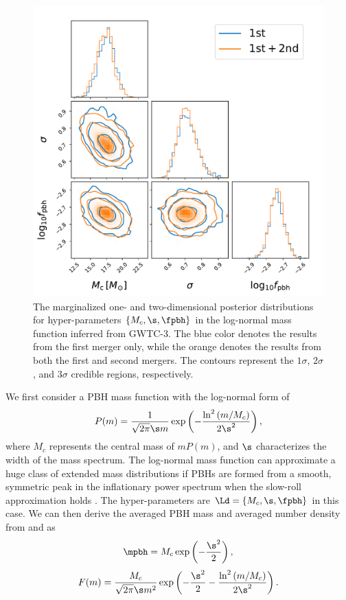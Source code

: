 \documentclass[
reprint,           %
superscriptaddress,%
amsmath,           %
amssymb,           %
aps,               %
prd,               %
notitlepage,       %
longbibliography,  %
floatfix,          %
nofootinbib,
]{revtex4-1}
\def\({\left(}
\def\){\right)}
\def\e{\begin{equation}}
\def\q{\end{equation}}
\begin{document}
\begin{figure}[tbp!]
	\centering
	\includegraphics[width=\linewidth]{post-log.pdf}
	\caption{\label{posterior-log}The marginalized one- and two-dimensional posterior distributions for hyper-parameters $\{M_c, \s, \fpbh\}$ in the log-normal mass function inferred from GWTC-3. The blue color denotes the results from the first merger only, while the orange denotes the results from both the first and second mergers. The contours represent the $1\sigma$, $2\sigma$, and $3\sigma$ credible regions, respectively.}
\end{figure}

We first consider a PBH mass function with the log-normal form of \cite{Dolgov:1992pu}
\e\label{log}
P(m) = \frac{1}{\sqrt{2\pi} \s m} \exp \(-\frac{\ln^2\(m/M_c\)}{2\s^2}\),
\q
where $M_c$ represents the central mass of $m P(m)$, and $\s$ characterizes the width of the mass spectrum.
The log-normal mass function can approximate a huge class of extended mass distributions if PBHs are formed from a smooth, symmetric peak in the inflationary power spectrum when the slow-roll approximation holds \cite{Green:2016xgy,Carr:2017jsz,Kannike:2017bxn}.
The hyper-parameters are $\Ld = \{M_c, \s, \fpbh\}$ in this case. 
We can then derive the averaged PBH mass and averaged number density from  and  as
\e
\mpbh = M_c \exp \(-\frac{\s^2}{2}\),
\q
\e 
F(m) = \frac{M_c}{\sqrt{2\pi} \s m^2} \exp \(-\frac{\s^2}{2}-\frac{\ln^2\(m/M_c\)}{2\s^2}\).
\q
\end{document}
